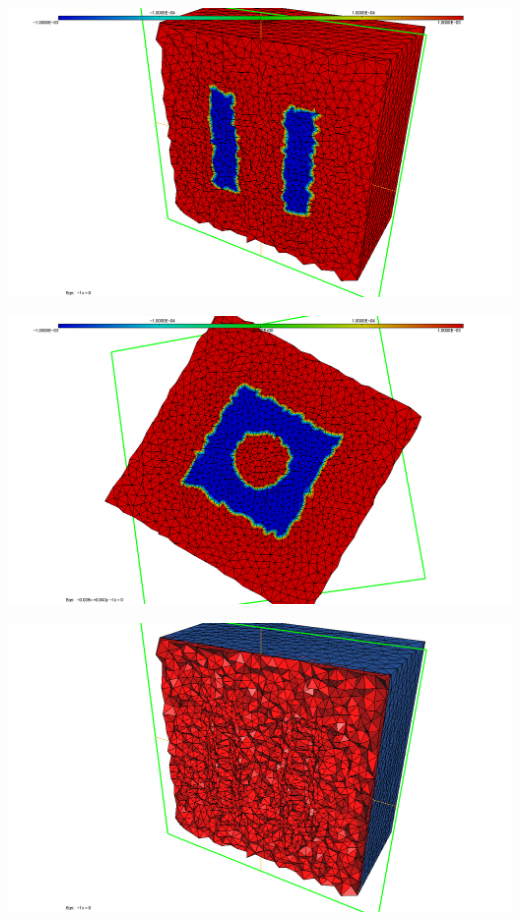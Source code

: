 \begingroup
	\begin{minipage}[t]{.5\linewidth}
		\centering
		\includegraphics[clip=true, trim=5cm 0 2cm 0, scale=.2]{Bordeaux/figures/3D/holeDomLS1.png}
	\end{minipage}
	\begin{minipage}[t]{.5\linewidth}
		\centering
		\includegraphics[clip=true, trim=5cm 0 2cm 0, scale=.2]{Bordeaux/figures/3D/holeDomLS2.png}
	\end{minipage}
	\begin{minipage}[t]{.5\linewidth}
		\centering
		\includegraphics[clip=true, trim=5cm 0 2cm 0, scale=.2]{Bordeaux/figures/3D/holeAdapt1.png}
	\end{minipage}
